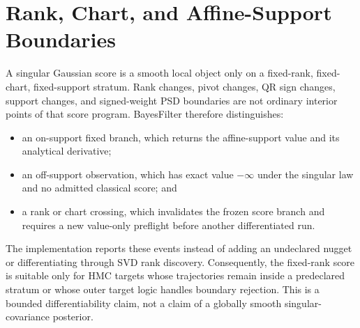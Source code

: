 \section{Rank, Chart, and Affine-Support Boundaries}
\label{sec:bf-rank-chart-support-boundaries}

A singular Gaussian score is a smooth local object only on a fixed-rank,
fixed-chart, fixed-support stratum.  Rank changes, pivot changes, QR sign
changes, support changes, and signed-weight PSD boundaries are not ordinary
interior points of that score program.  BayesFilter therefore distinguishes:
\begin{itemize}
  \item an on-support fixed branch, which returns the affine-support value and
    its analytical derivative;
  \item an off-support observation, which has exact value \(-\infty\) under the
    singular law and no admitted classical score; and
  \item a rank or chart crossing, which invalidates the frozen score branch and
    requires a new value-only preflight before another differentiated run.
\end{itemize}
The implementation reports these events instead of adding an undeclared nugget
or differentiating through SVD rank discovery.  Consequently, the fixed-rank
score is suitable only for HMC targets whose trajectories remain inside a
predeclared stratum or whose outer target logic handles boundary rejection.
This is a bounded differentiability claim, not a claim of a globally smooth
singular-covariance posterior.
